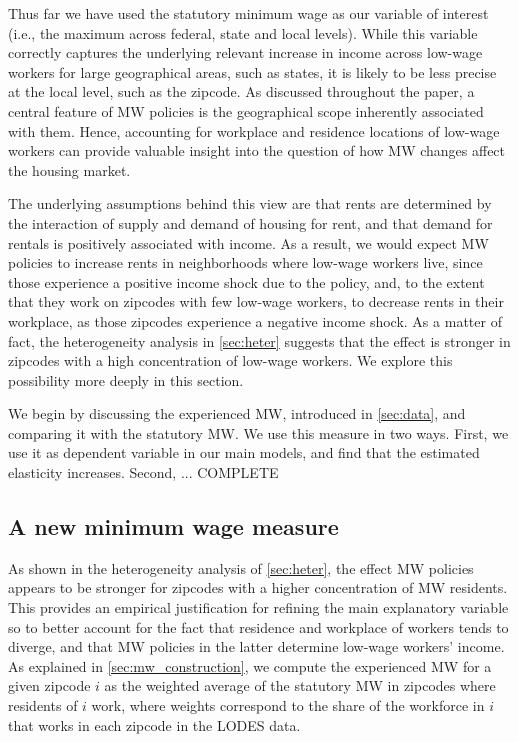 
Thus far we have used the statutory minimum wage as our variable of interest (i.e., 
the maximum across federal, state and local levels). While this variable correctly 
captures the underlying relevant increase in income across low-wage workers for large
geographical areas, such as states, it is likely to be less precise at the local level, 
such as the zipcode. As discussed throughout the paper, a central feature of MW 
policies is the geographical scope inherently associated with them. Hence, accounting 
for workplace and residence locations of low-wage workers can provide valuable insight 
into the question of how MW changes affect the housing market. 

The underlying assumptions behind this view are that rents are determined by the 
interaction of supply and demand of housing for rent, and that demand for rentals is
positively associated with income. As a result, we would expect MW policies to increase 
rents in neighborhoods where low-wage workers live, since those experience a positive
income shock due to the policy, and, to the extent that they work on zipcodes with few 
low-wage workers, to decrease rents in their workplace, as those zipcodes experience
a negative income shock. As a matter of fact, the heterogeneity analysis in 
\autoref{sec:heter} suggests that the effect is stronger in zipcodes with a high
concentration of low-wage workers. We explore this possibility more deeply in this 
section.

We begin by discussing the experienced MW, introduced in \autoref{sec:data}, and 
comparing it with the statutory MW. We use this measure in two ways. First, we use
it as dependent variable in our main models, and find that the estimated elasticity 
increases. Second, ... COMPLETE

\subsection{A new minimum wage measure}

As shown in the heterogeneity analysis of \autoref{sec:heter}, the effect MW policies 
appears to be stronger for zipcodes with a higher concentration of MW residents. This 
provides an empirical justification for refining the main explanatory variable so to 
better account for the fact that residence and workplace of workers tends to diverge, 
and that MW policies in the latter determine low-wage workers' income. As explained in 
\autoref{sec:mw_construction}, we compute the experienced MW for a given zipcode $i$ as 
the weighted average of the statutory MW in zipcodes where residents of $i$ work, where 
weights correspond to the share of the workforce in $i$ that works in each zipcode in 
the LODES data.

